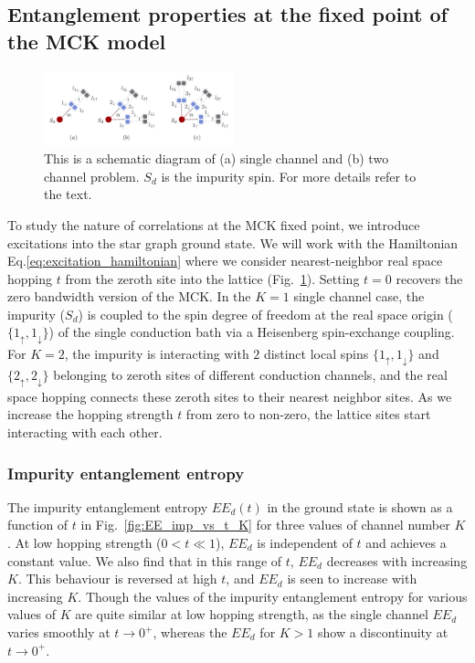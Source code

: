 \documentclass{iopart}
\begin{document}
\subsection{Entanglement properties at the fixed point of the MCK model}
\label{sec:EE_excitation}

\begin{figure}[!htpb]
\includegraphics[width=0.49\textwidth]{hoppingfockstates}
\caption{This is a schematic diagram of (a) single channel and (b) two channel problem. $S_d$ is the impurity spin. For more details refer to the text.}
\label{fig:schematic_hopping}
\end{figure}

To study the nature of correlations at the MCK fixed point, we introduce excitations into the star graph ground state. We will work with the Hamiltonian Eq.\eqref{eq:excitation_hamiltonian} where we consider nearest-neighbor real space hopping \(t\) from the zeroth site into the lattice (Fig.~\ref{fig:schematic_hopping}). Setting $t=0$ recovers the zero bandwidth version of the MCK. In the \(K=1\) single channel case, the impurity ($S_d$) is coupled to the spin degree of freedom at the real space origin ($\{1_{\uparrow},1_{\downarrow}\}$) of the single conduction bath via a Heisenberg spin-exchange coupling. For $K=2$, the impurity is interacting with $2$ distinct local spins $\{1_{\uparrow},1_{\downarrow}\}$ and $\{2_{\uparrow},2_{\downarrow}\}$ belonging to zeroth sites of different conduction channels, and the real space hopping connects these zeroth sites to their nearest neighbor sites. As we increase the hopping strength $t$ from zero to non-zero, the lattice sites start interacting with each other.

\subsubsection{Impurity entanglement entropy}
The impurity entanglement entropy $EE_d(t)$ in the ground state is shown as a function of $t$ in Fig.~\ref{fig:EE_imp_vs_t_K} for three values of channel number \(K\). At low hopping strength ($0<t\ll 1$), $EE_{d}$ is independent of $t$ and achieves a constant value. We also find that in this range of \(t\), \(EE_d\) decreases with increasing \(K\). This behaviour is reversed at high $t$, and \(EE_d\) is seen to increase with increasing \(K\). Though the values of the impurity entanglement entropy for various values of \(K\) are quite similar at low hopping strength, 
as the single channel \(EE_d\) varies smoothly at \(t \to 0^+\), whereas the \(EE_d\) for \(K > 1\) show a discontinuity at $t \to 0^+$.
\end{document}
